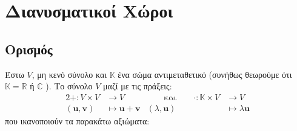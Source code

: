 


\let\vec\mathbf

\pagestyle{vangelis}




\chapter{Διανυσματικοί Χώροι}

\section{Ορισμός}

\begin{dfn}
\item {}
    Έστω $V$, μη κενό σύνολο και $\mathbb{K}$ ένα σώμα αντιμεταθετικό 
    (συνήθως θεωρούμε ότι $ \mathbb{K} = \mathbb{R} $ ή $\mathbb{C}$ ). 
    Το σύνολο $V$ μαζί με τις πράξεις:
    \begin{alignat*}{2}
        + \colon V \times V &\to V & \qquad \text{και} \qquad \cdot \colon \mathbb{K} 
        \times V &\to V \\ ( \vec{u}, \vec{v} ) &\mapsto \vec{u} + \vec{v} 
                 & ( \lambda, \vec{u} ) &\mapsto \lambda \vec{u} 
    \end{alignat*}
    \vspace{\baselineskip}
    που ικανοποιούν τα παρακάτω αξιώματα:


\end{dfn}

